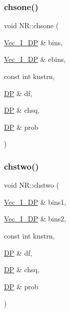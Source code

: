 \mbox{\label{namespaceNR_a79990074123af59275160b7887c3fc51}} 
\subsubsection{\texorpdfstring{chsone()}{chsone()}}
{\footnotesize\ttfamily void N\+R\+::chsone (\begin{DoxyParamCaption}\item[{\mbox{\hyperlink{namespaceNR_a9f943da53862537c552e2a770cb170ae}{Vec\+\_\+\+I\+\_\+\+DP}} \&}]{bins,  }\item[{\mbox{\hyperlink{namespaceNR_a9f943da53862537c552e2a770cb170ae}{Vec\+\_\+\+I\+\_\+\+DP}} \&}]{ebins,  }\item[{const int}]{knstrn,  }\item[{\mbox{\hyperlink{namespaceNR_af6ff762dd605ff477b8e52387253a02a}{DP}} \&}]{df,  }\item[{\mbox{\hyperlink{namespaceNR_af6ff762dd605ff477b8e52387253a02a}{DP}} \&}]{chsq,  }\item[{\mbox{\hyperlink{namespaceNR_af6ff762dd605ff477b8e52387253a02a}{DP}} \&}]{prob }\end{DoxyParamCaption})}

\mbox{\label{namespaceNR_ae212f167f2b1e98deda943eb3aacd84b}} 
\subsubsection{\texorpdfstring{chstwo()}{chstwo()}}
{\footnotesize\ttfamily void N\+R\+::chstwo (\begin{DoxyParamCaption}\item[{\mbox{\hyperlink{namespaceNR_a9f943da53862537c552e2a770cb170ae}{Vec\+\_\+\+I\+\_\+\+DP}} \&}]{bins1,  }\item[{\mbox{\hyperlink{namespaceNR_a9f943da53862537c552e2a770cb170ae}{Vec\+\_\+\+I\+\_\+\+DP}} \&}]{bins2,  }\item[{const int}]{knstrn,  }\item[{\mbox{\hyperlink{namespaceNR_af6ff762dd605ff477b8e52387253a02a}{DP}} \&}]{df,  }\item[{\mbox{\hyperlink{namespaceNR_af6ff762dd605ff477b8e52387253a02a}{DP}} \&}]{chsq,  }\item[{\mbox{\hyperlink{namespaceNR_af6ff762dd605ff477b8e52387253a02a}{DP}} \&}]{prob }\end{DoxyParamCaption})}

